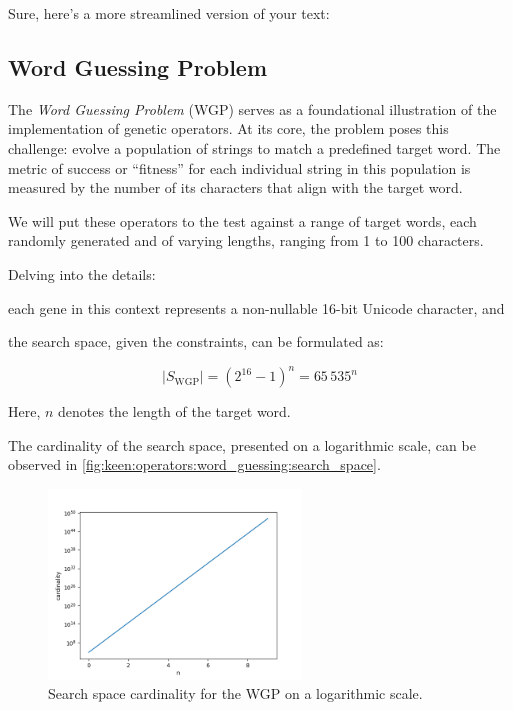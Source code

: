 Sure, here's a more streamlined version of your text:

\subsection{Word Guessing Problem}
\label{sec:keen:operators:word_guessing}
  The \emph{Word Guessing Problem} (WGP) serves as a foundational illustration 
  of the implementation of genetic operators.
  At its core, the problem poses this challenge: evolve a population of strings
  to match a predefined target word.
  The metric of success or \enquote{fitness} for each individual string in this 
  population is measured by the number of its characters that align with the 
  target word.

  We will put these operators to the test against a range of target words, each 
  randomly generated and of varying lengths, ranging from 1 to 100 characters.

  Delving into the details:
  \begin{enumerate*}[label=(\roman*)]
    \item each gene in this context represents a non-nullable 16-bit Unicode 
      character, and
    \item the search space, given the constraints, can be formulated as:
  \end{enumerate*}
    
    \begin{equation}
    \label{eq:keen:operators:word_guessing:search_space}
      |S_\mathrm{WGP}| = (2^{16} - 1)^n = 65\,535^n
    \end{equation}

    Here, \(n\) denotes the length of the target word.

  The cardinality of the search space, presented on a logarithmic scale, can be 
  observed in \vref{fig:keen:operators:word_guessing:search_space}.

  \begin{figure}[ht!]
    \centering
    \includegraphics[width=0.6\textwidth]{img/keen/wgp_cardinality.png}
    \caption{Search space cardinality for the WGP on a logarithmic scale.}
    \label{fig:keen:operators:word_guessing:search_space}
  \end{figure}

